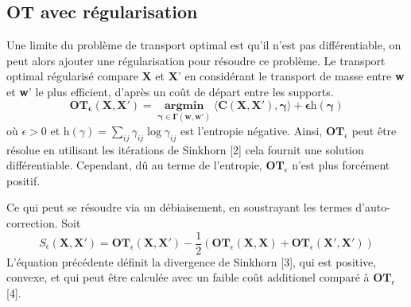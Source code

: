 \documentclass[acmsmall, natbib=false, nonacm]{acmart}
\begin{document}
\subsection{OT avec régularisation}
Une limite du problème de transport optimal est qu'il n'est pas différentiable, on peut alors ajouter une régularisation pour résoudre ce problème.
Le transport optimal régularisé compare \textbf{X} et \textbf{X}' en considérant le transport de masse entre \textbf{w} et \textbf{w}' le plus efficient, d'après un coût de départ entre les supports.
$$\mathbf{OT_{\epsilon}(\textbf{X}, \textbf{X}') = \underset{\gamma \in \Gamma(\textbf{w}, \textbf{w}')}{\operatorname{\arg \min}} \langle \textbf{C}(\textbf{X}, \textbf{X}'), \gamma \rangle + \epsilon \textit{h}(\gamma)}$$
où $\epsilon > 0$ et $\textit{h}(\gamma) = \sum_{ij}\gamma_{ij} \log \gamma_{ij}$ est l'entropie négative. 
Ainsi, $\textbf{OT}_{\epsilon}$ peut être résolue en utilisant les itérations de Sinkhorn [2] cela fournit une solution différentiable.
Cependant, dû au terme de l'entropie, $\textbf{OT}_{\epsilon}$ n'est plus forcément positif. 

Ce qui peut se résoudre via un débiaisement, en soustrayant les termes d'auto-correction. Soit
$$S_{\epsilon}(\textbf{X}, \textbf{X}') = \textbf{OT}_{\epsilon}(\textbf{X},\textbf{X}') - \frac{1}{2}(\textbf{OT}_{\epsilon}(\textbf{X}, \textbf{X}) + \textbf{OT}_{\epsilon}(\textbf{X}', \textbf{X}'))$$
L'équation précédente définit la divergence de Sinkhorn [3], qui est positive, convexe, et qui peut être calculée avec un faible coût additionel comparé à $\textbf{OT}_{\epsilon}$ [4]. 
\end{document}

